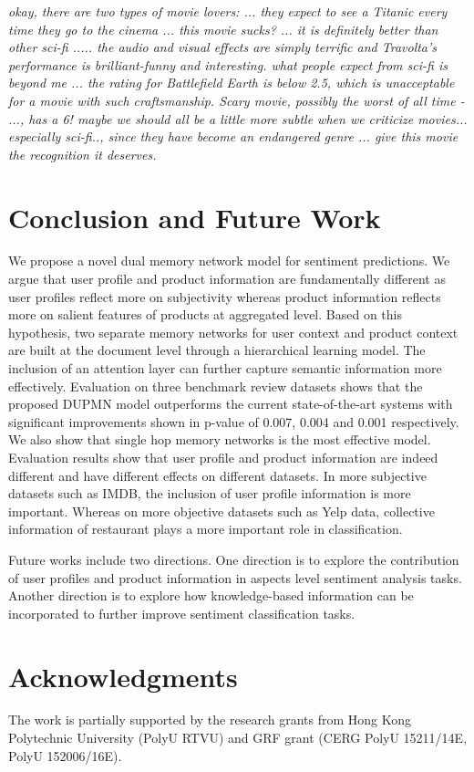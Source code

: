 \documentclass[11pt,a4paper]{article}
\begin{document}
\begin{small}
\textit{okay, there are two types of movie lovers: ... they expect to see a Titanic every time they go to the cinema ... this movie sucks? ... it is definitely better than other sci-fi ..... the audio and visual effects are simply terrific and Travolta's performance is brilliant-funny and interesting. what people expect from sci-fi is beyond me ... the rating for Battlefield Earth is below 2.5, which is unacceptable for a movie with such craftsmanship. Scary movie, possibly the worst of all time - ..., has a 6! maybe we should all be a little more subtle when we criticize movies... especially sci-fi.., since they have become an endangered genre ... give this movie the recognition it deserves.}
\end{small}

\section{Conclusion and Future Work}\label{sec:Conclusion and future works}
We propose a novel dual memory network model for sentiment predictions.
We argue that user profile and product information are fundamentally different as user profiles reflect more on subjectivity whereas product information reflects more on salient features of products at aggregated level. Based on this hypothesis, two separate memory networks for user context and product context are built 
at the document level through a hierarchical learning model. The inclusion of an attention layer can further capture semantic information more effectively. Evaluation on three benchmark review datasets shows that the proposed DUPMN model outperforms the current state-of-the-art systems with significant improvements shown in p-value of 0.007, 0.004 and 0.001 respectively. We also show that single hop memory networks is the most effective model.  Evaluation results show that user profile and product information are indeed different and have different effects on different datasets. 
In more subjective datasets such as IMDB, the inclusion of user profile information is more important. Whereas on more objective datasets such as Yelp data, collective information of restaurant plays a more important role in classification.


Future works include two directions. One direction is to explore the contribution of user profiles and product information in aspects level sentiment analysis tasks. Another direction is to explore how knowledge-based information can be incorporated to further improve sentiment classification tasks. 

\section*{Acknowledgments}
The work is partially supported by the research grants from Hong Kong Polytechnic University (PolyU RTVU) and GRF grant (CERG PolyU 15211/14E, PolyU 152006/16E).








\end{document}
